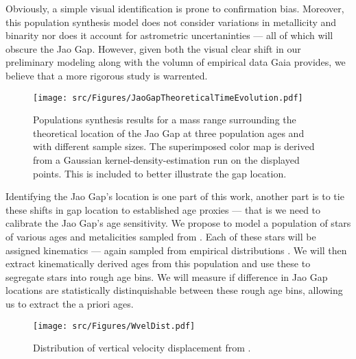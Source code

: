 Obviously, a simple visual identification is prone to confirmation bias.
Moreover, this population synthesis model does not consider variations in
metallicity and binarity nor does it account for astrometric uncertaninties ---
all of which will obscure the Jao Gap. However, given both the visual clear
shift in our preliminary modeling along with the volumn of empirical data Gaia
provides, we believe that a more rigorous study is warrented.


\begin{figure}
	\centering
	\texttt{[image: src/Figures/JaoGapTheoreticalTimeEvolution.pdf]}
	\caption{Populations synthesis results for a mass range surrounding the
	theoretical location of the Jao Gap at three population ages and with different
	sample sizes. The superimposed color map is derived from a Gaussian
	kernel-density-estimation run on the displayed points. This is included to
	better illustrate the gap location.}
	\label{fig:JGTTE}
\end{figure}

Identifying the Jao Gap's location is one part of this work, another part is to
tie these shifts in gap location to established age proxies --- that is we need
to calibrate the Jao Gap's age sensitivity. We propose to model a population of
stars of various ages and metalicities sampled from \citet{Holmberg2009}.
Each of these stars will be assigned kinematics --- again sampled from
empirical distributions \citep[Figure \ref{fig:LuKde},][]{Lu2021}. We will then
extract kinematically derived ages from this population and use these to
segregate stars into rough age bins. We will measure if difference in
Jao Gap locations are statistically distinquishable between these rough age
bins, allowing us to extract the a priori ages.

\begin{figure}
	\centering
	\texttt{[image: src/Figures/WvelDist.pdf]}
	\caption{Distribution of vertical velocity displacement from \citet{Lu2021}.}
	\label{fig:LuKde}
\end{figure}
